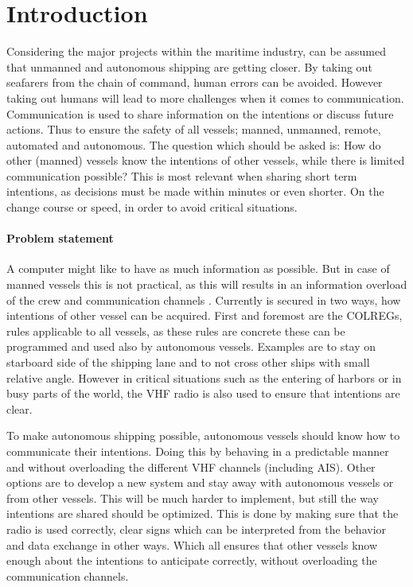 \chapter*{Introduction}
\label{sec:introduction}

Considering the major projects within the maritime industry, can be assumed that unmanned and autonomous shipping are getting closer. By taking out seafarers from the chain of command, human errors can be avoided. However taking out humans will lead to more challenges when it comes to communication. Communication is used to share information on the intentions or discuss future actions. Thus to ensure the safety of all vessels; manned, unmanned, remote, automated and autonomous. The question which should be asked is: How do other (manned) vessels know the intentions of other vessels, while there is limited communication possible? This is most relevant when sharing short term intentions, as decisions must be made within minutes or even shorter. On the change course or speed, in order to avoid critical situations.

\subsubsection*{Problem statement}
A computer might like to have as much information as possible. But in case of manned vessels this is not practical, as this will results in an information overload of the crew and communication channels \cite{CCNR2017}. Currently is secured in two ways, how intentions of other vessel can be acquired. First and foremost are the \ac{COLREGs}\cite{IMO1972}, rules applicable to all vessels, as these rules are concrete these can be programmed and used also by autonomous vessels. Examples are to stay on starboard side of the shipping lane and to not cross other ships with small relative angle. However in critical situations such as the entering of harbors or in busy parts of the world, the VHF radio is also used to ensure that intentions are clear.

To make autonomous shipping possible, autonomous vessels should know how to communicate their intentions. Doing this by behaving in a predictable manner and without overloading the different VHF channels (including AIS). Other options are to develop a new system and stay away with autonomous vessels or from other vessels. This will be much harder to implement, but still the way intentions are shared should be optimized. This is done by making sure that the radio is used correctly, clear signs which can be interpreted from the behavior and data exchange in other ways. Which all ensures that other vessels know enough about the intentions to anticipate correctly, without overloading the communication channels.

